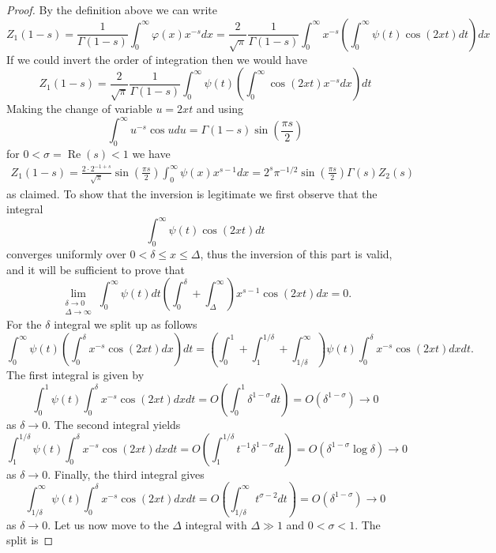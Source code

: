 \documentclass[11pt]{article}
\numberwithin{equation}{section}		 			%
\numberwithin{figure}{section}			 			%
\begin{document}
\begin{proof}
By the definition above we can write
\[
Z_1 (1 - s) = \frac{1}
{{\Gamma (1 - s)}}\int_0^\infty  {\varphi (x)x^{ - s} dx}  = \frac{2}
{{\sqrt \pi  }}\frac{1}
{{\Gamma (1 - s)}}\int_0^\infty  {x^{ - s} \left( {\int_0^\infty  {\psi (t)\cos (2xt)dt} } \right)dx} 
\]
If we could invert the order of integration then we would have
\[
Z_1 (1 - s) = \frac{2}{{\sqrt \pi  }}\frac{1}{{\Gamma (1 - s)}}\int_0^\infty  {\psi (t)\left( {\int_0^\infty  {\cos (2xt)x^{ - s} dx} } \right)dt} 
\]
Making the change of variable $u=2xt$ and using
\[
\int_0^\infty  {u^{ - s} \cos udu}  = \Gamma (1 - s)\sin \left( {\frac{{\pi s}}{2}} \right)
\]
for $0 < \sigma = \operatorname{Re}(s) < 1$ we have
\begin{align} \label{preinversecosine}
Z_1 (1 - s) = \frac{{2 \cdot 2^{ - 1 + s} }}{{\sqrt \pi  }}\sin \left( {\frac{{\pi s}}{2}} \right)\int_0^\infty  {\psi (x)x^{s - 1} dx}  = 2^s \pi ^{ - 1/2} \sin \left( {\frac{{\pi s}}{2}} \right)\Gamma (s)Z_2 (s)
\end{align}
as claimed. To show that the inversion is legitimate we first observe that the integral
\[
\int_0^\infty  {\psi (t)\cos (2xt)dt} 
\]
converges uniformly over $0 < \delta \le x \le \Delta$, thus the inversion of this part is valid, and it will be sufficient to prove that
\[
\lim_{\substack{\delta \rightarrow 0\\ \Delta \rightarrow \infty}} \int_0^\infty  {\psi (t)dt\left( {\int_0^\delta  {}  + \int_\Delta ^\infty  {} } \right){x^{s - 1}}\cos (2xt)dx}  = 0.\]
For the $\delta$ integral we split up as follows
\[\int_0^\infty  {\psi (t)\left( {\int_0^\delta  {{x^{ - s}}\cos (2xt)dx} } \right)dt}  = \left( {\int_0^1 {}  + \int_1^{1/\delta } {}  + \int_{1/\delta }^\infty  {} } \right)\psi (t)\int_0^\delta  {{x^{ - s}}\cos (2xt)dx} dt.\]
The first integral is given by
\[\int_0^1 {\psi (t)\int_0^\delta  {{x^{ - s}}\cos (2xt)dx} dt}  = O\left( {\int_0^1 {{\delta ^{1 - \sigma }}dt} } \right) = O({\delta ^{1 - \sigma }}) \to 0\]
as $\delta \to 0$. The second integral yields
\[\int_1^{1/\delta } {\psi (t)\int_0^\delta  {{x^{ - s}}\cos (2xt)dx} dt}  = O\left( {\int_1^{1/\delta } {{t^{ - 1}}{\delta ^{1 - \sigma }}dt} } \right) = O({\delta ^{1 - \sigma }}\log \delta ) \to 0\]
as $\delta \to 0$. Finally, the third integral gives
\[\int_{1/\delta }^\infty  {\psi (t)\int_0^\delta  {{x^{ - s}}\cos (2xt)dx} dt}  = O\left( {\int_{1/\delta }^\infty  {{t^{\sigma  - 2}}dt} } \right) = O({\delta ^{1 - \sigma }}) \to 0\]
as $\delta \to 0$. Let us now move to the $\Delta$ integral with $\Delta \gg 1$ and $0 < \sigma < 1$. The split is

\end{proof}
\end{document}
